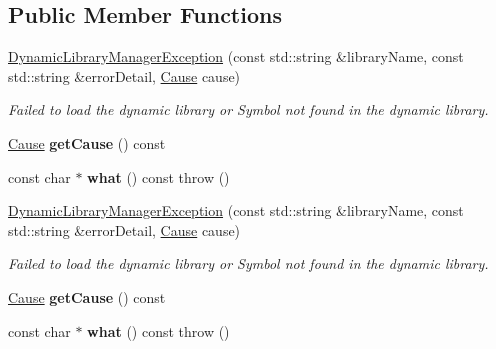 \subsection*{Public Member Functions}
\begin{DoxyCompactItemize}
\item 
\hypertarget{class_dynamic_library_manager_exception_a7de57865061413cef4c9020da48fe871}{\hyperlink{class_dynamic_library_manager_exception_a7de57865061413cef4c9020da48fe871}{Dynamic\+Library\+Manager\+Exception} (const std\+::string \&library\+Name, const std\+::string \&error\+Detail, \hyperlink{class_dynamic_library_manager_exception_a73b4694c152e0693fbc19fb04987a0b9}{Cause} cause)}\label{class_dynamic_library_manager_exception_a7de57865061413cef4c9020da48fe871}

\begin{DoxyCompactList}\small\item\em Failed to load the dynamic library or Symbol not found in the dynamic library. \end{DoxyCompactList}\item 
\hypertarget{class_dynamic_library_manager_exception_a68a3ebc5fc7b32b063e3475d9a0c75c9}{\hyperlink{class_dynamic_library_manager_exception_a73b4694c152e0693fbc19fb04987a0b9}{Cause} {\bfseries get\+Cause} () const }\label{class_dynamic_library_manager_exception_a68a3ebc5fc7b32b063e3475d9a0c75c9}

\item 
\hypertarget{class_dynamic_library_manager_exception_aa373e3a08fa8a51fd190061d543b5dfd}{const char $\ast$ {\bfseries what} () const   throw ()}\label{class_dynamic_library_manager_exception_aa373e3a08fa8a51fd190061d543b5dfd}

\item 
\hypertarget{class_dynamic_library_manager_exception_a15629092a054849f1cb73f8f468f8125}{\hyperlink{class_dynamic_library_manager_exception_a15629092a054849f1cb73f8f468f8125}{Dynamic\+Library\+Manager\+Exception} (const std\+::string \&library\+Name, const std\+::string \&error\+Detail, \hyperlink{class_dynamic_library_manager_exception_a73b4694c152e0693fbc19fb04987a0b9}{Cause} cause)}\label{class_dynamic_library_manager_exception_a15629092a054849f1cb73f8f468f8125}

\begin{DoxyCompactList}\small\item\em Failed to load the dynamic library or Symbol not found in the dynamic library. \end{DoxyCompactList}\item 
\hypertarget{class_dynamic_library_manager_exception_ab389b721f9a45814b8269ba865a1f25f}{\hyperlink{class_dynamic_library_manager_exception_a73b4694c152e0693fbc19fb04987a0b9}{Cause} {\bfseries get\+Cause} () const }\label{class_dynamic_library_manager_exception_ab389b721f9a45814b8269ba865a1f25f}

\item 
\hypertarget{class_dynamic_library_manager_exception_a3e6ed8a5e743a8ac80e4cb73a5d87360}{const char $\ast$ {\bfseries what} () const   throw ()}\label{class_dynamic_library_manager_exception_a3e6ed8a5e743a8ac80e4cb73a5d87360}

\end{DoxyCompactItemize}


